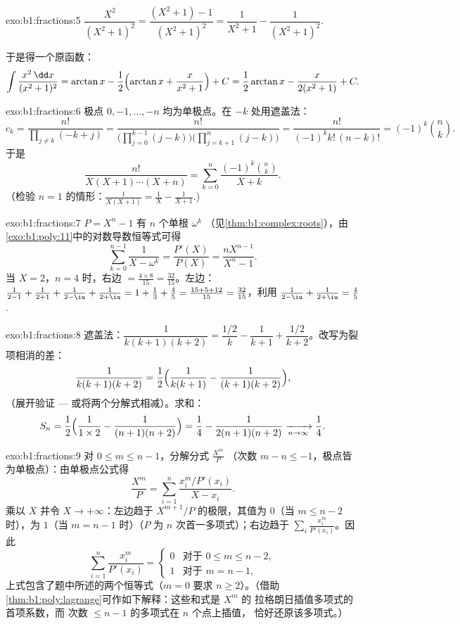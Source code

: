 \begin{solution}{exo:b1:fractions:5}
$\dfrac{X^2}{(X^2+1)^2} = \dfrac{(X^2 + 1) - 1}{(X^2+1)^2} =
\dfrac{1}{X^2+1} - \dfrac{1}{(X^2+1)^2}$.

于是得一个原函数：
\[
\int \frac{x^2\,\dd x}{(x^2+1)^2}
= \arctan x - \frac12\Bigl(\arctan x + \frac{x}{x^2+1}\Bigr) + C
= \frac12\arctan x - \frac{x}{2(x^2+1)} + C .
\]
\end{solution}

\begin{solution}{exo:b1:fractions:6}
极点 $0, -1, \dots, -n$ 均为单极点。在 $-k$ 处用遮盖法：
\[
c_k = \frac{n!}{\prod_{j \neq k} (-k + j)}
= \frac{n!}{\bigl(\prod_{j=0}^{k-1}(j - k)\bigr)
\bigl(\prod_{j=k+1}^{n}(j-k)\bigr)}
= \frac{n!}{(-1)^k k!\,(n-k)!} = (-1)^k \binom nk .
\]
于是
\[
\frac{n!}{X(X+1)\cdots(X+n)}
= \sum_{k=0}^{n} \frac{(-1)^k \binom nk}{X + k} .
\]
（检验 $n = 1$ 的情形：$\frac{1}{X(X+1)} = \frac1X -
\frac{1}{X+1}$.)
\end{solution}

\begin{solution}{exo:b1:fractions:7}
$P = X^n - 1$ 有 $n$ 个单根 $\omega^k$
（见\cref{thm:b1:complex:roots}），由
\cref{exo:b1:poly:11}中的对数导数恒等式可得
\[
\sum_{k=0}^{n-1} \frac{1}{X - \omega^k}
= \frac{P'(X)}{P(X)} = \frac{n X^{n-1}}{X^n - 1} .
\]
当 $X = 2$，$n = 4$ 时，右边 $= \frac{4 \times 8}{15} =
\frac{32}{15}$。左边：$\frac{1}{2-1} + \frac{1}{2+1} +
\frac{1}{2 - \iu} + \frac{1}{2 + \iu} = 1 + \frac13 + \frac{4}{5} =
\frac{15 + 5 + 12}{15} = \frac{32}{15}$，利用 $\frac{1}{2-\iu} +
\frac{1}{2+\iu} = \frac{4}{5}$.
\end{solution}

\begin{solution}{exo:b1:fractions:8}
遮盖法：$\dfrac{1}{k(k+1)(k+2)} = \dfrac{1/2}{k} - \dfrac{1}{k+1} +
\dfrac{1/2}{k+2}$。改写为裂项相消的差：
\[
\frac{1}{k(k+1)(k+2)}
= \frac12\Bigl(\frac{1}{k(k+1)} - \frac{1}{(k+1)(k+2)}\Bigr),
\]
（展开验证 --- 或将两个分解式相减）。求和：
\[
S_n = \frac12\Bigl(\frac{1}{1 \times 2} - \frac{1}{(n+1)(n+2)}\Bigr)
= \frac14 - \frac{1}{2(n+1)(n+2)}
\xrightarrow[n \to \infty]{} \frac14 .
\]
\end{solution}

\begin{solution}{exo:b1:fractions:9}
对 $0 \leq m \leq n - 1$，分解分式 $\frac{X^m}{P}$
（次数 $m - n \leq -1$，极点皆为单极点）：由单极点公式得
\[
\frac{X^m}{P} = \sum_{i=1}^{n} \frac{x_i^m / P'(x_i)}{X - x_i} .
\]
乘以 $X$ 并令 $X \to +\infty$：左边趋于
$X^{m+1}/P$ 的极限，其值为 $0$（当 $m \leq n - 2$ 时），为 $1$（当 $m =
n - 1$ 时）（$P$ 为 $n$ 次首一多项式）；右边趋于
$\sum_i \frac{x_i^m}{P'(x_i)}$。因此
\[
\sum_{i=1}^{n} \frac{x_i^{m}}{P'(x_i)} =
\begin{cases}
0 & \text{对于 } 0 \leq m \leq n-2,\\
1 & \text{对于 } m = n - 1,
\end{cases}
\]
上式包含了题中所述的两个恒等式（$m = 0$ 要求 $n \geq
2$）。（借助\cref{thm:b1:poly:lagrange}可作如下解释：这些和式是
$X^m$ 的 拉格朗日插值多项式的首项系数，而
次数 $\leq n-1$ 的多项式在 $n$ 个点上插值，
恰好还原该多项式。）
\end{solution}

